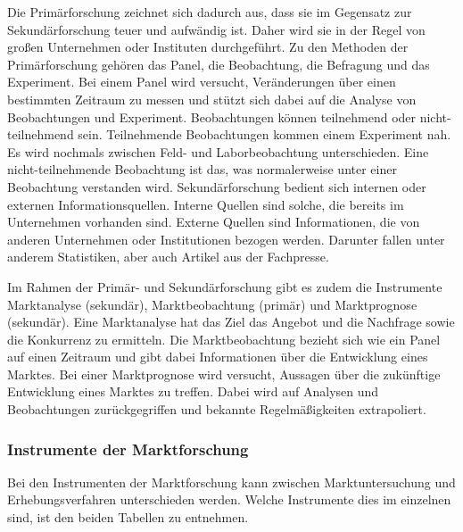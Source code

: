 \noindent Die Primärforschung zeichnet sich dadurch aus, dass sie im Gegensatz zur Sekundärforschung teuer und aufwändig ist. Daher wird sie in der Regel von großen Unternehmen oder Instituten durchgeführt. Zu den Methoden der Primärforschung gehören das Panel, die Beobachtung, die Befragung und das Experiment. Bei einem Panel wird versucht, Veränderungen über einen bestimmten Zeitraum zu messen und stützt sich dabei auf die Analyse von Beobachtungen und Experiment. Beobachtungen können teilnehmend oder nicht-teilnehmend sein. Teilnehmende Beobachtungen kommen einem Experiment nah. Es wird nochmals zwischen Feld- und Laborbeobachtung unterschieden. Eine nicht-teilnehmende Beobachtung ist das, was normalerweise unter einer Beobachtung verstanden wird. Sekundärforschung bedient sich internen oder externen Informationsquellen. Interne Quellen sind solche, die bereits im Unternehmen vorhanden sind. Externe Quellen sind Informationen, die von anderen Unternehmen oder Institutionen bezogen werden. Darunter fallen unter anderem Statistiken, aber auch Artikel aus der Fachpresse.

Im Rahmen der Primär- und Sekundärforschung gibt es zudem die Instrumente Marktanalyse (sekundär), Marktbeobachtung (primär) und Marktprognose (sekundär). Eine Marktanalyse hat das Ziel das Angebot und die Nachfrage sowie die Konkurrenz zu ermitteln. Die Marktbeobachtung bezieht sich wie ein Panel auf einen Zeitraum und gibt dabei Informationen über die Entwicklung eines Marktes. Bei einer Marktprognose wird versucht, Aussagen über die zukünftige Entwicklung eines Marktes zu treffen. Dabei wird auf Analysen und Beobachtungen zurückgegriffen und bekannte Regelmäßigkeiten extrapoliert.

\subsubsection{Instrumente der Marktforschung}
Bei den Instrumenten der Marktforschung kann zwischen Marktuntersuchung und Erhebungsverfahren unterschieden werden. Welche Instrumente dies im einzelnen sind, ist den beiden Tabellen zu entnehmen.


